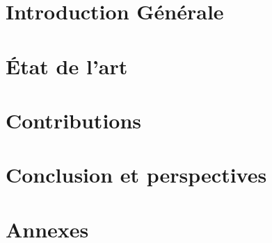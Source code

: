 \documentclass[11pt]{style/thloria}
\begin{document}
{
\hypersetup{linkcolor=black}
\dominitoc
\WritePartLabelInToc
\WriteChapterLabelInToc
\tableofcontents


\WriteThisInToc
{\listoffigures \let\cleardoublepage\clearpage \listoftables}
} %


\mainmatter


\part{Introduction Générale}

\part{État de l'art}


\part{Contributions}



\part{Conclusion et perspectives}


\part{Annexes}




\end{document}
